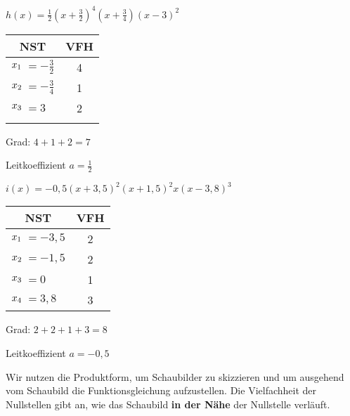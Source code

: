 \begin{minipage}{\textwidth}
\begin{minipage}{0.5\textwidth}\centering
	\(h(x)=\frac{1}{2}\left(x+\frac{3}{2}\right)^4\left(x+\frac{3}{4}\right)\left(x-3\right)^2\)

	{\color{loes}
			\begin{tabular}{rlc}
				\multicolumn{2}{c}{NST}&VFH\\
				\midrule
				\(x_1\hspace{-0.3cm}\)&\(=-\frac{3}{2}\)&4\\
				\(x_2\hspace{-0.3cm}\)&\(=-\frac{3}{4}\)&1\\
				\(x_3\hspace{-0.3cm}\)&\(=3\)&2\\
				\phantom{\(x_3\)}&\phantom{\(=2\)}&\phantom{1}
			\end{tabular}%

		Grad: \(4+1+2=7\)

		Leitkoeffizient \(a=\frac{1}{2}\)}
\end{minipage}%
\begin{minipage}{0.5\textwidth}\centering
	\(i(x)=-0,5\left(x+3,5\right)^2\left(x+1,5\right)^2x\left(x-3,8\right)^3\)

	{\color{loes}
			\begin{tabular}{rlc}
				\multicolumn{2}{c}{NST}&VFH\\
				\midrule
				\(x_1\hspace{-0.3cm}\)&\(=-3,5\)&2\\
				\(x_2\hspace{-0.3cm}\)&\(=-1,5\)&2\\
				\(x_3\hspace{-0.3cm}\)&\(=0\)&1\\
				\(x_4\hspace{-0.3cm}\)&\(=3,8\)&3
			\end{tabular}%

		Grad: \(2+2+1+3=8\)

		Leitkoeffizient \(a=-0,5\)}
\end{minipage}%
\end{minipage}
\newpage
Wir nutzen die Produktform, um Schaubilder zu skizzieren und um ausgehend vom Schaubild die Funktionsgleichung aufzustellen. Die Vielfachheit der Nullstellen gibt an, wie das Schaubild \textbf{in der Nähe} der Nullstelle verläuft.


